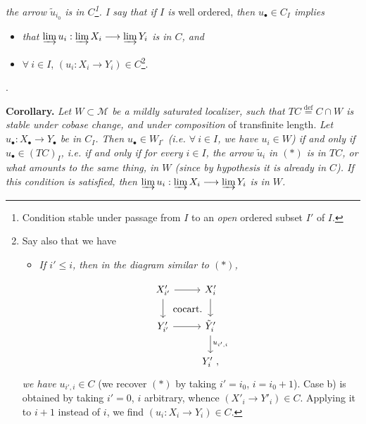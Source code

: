 \documentclass[11pt]{article}
\newcommand{\printedpage}[1]{\marginpar{\footnotesize p.~#1}}
\newcommand{\msp}[1]{\marginpar{\footnotesize [#1]}}
\begin{document}
\textit{the arrow $\tilde{u}_{i_0}$ is in $C$\footnote{Condition stable under passage from $I$ to an \textit{open} ordered subset $I'$ of $I$.}. I say that if $I$ is} well ordered, \textit{then $u_\bullet \in C_I$ implies}
\begin{itemize}[leftmargin=2.5em]
\item[a)] \textit{that $\varinjlim u_i : \varinjlim X_i \longrightarrow \varinjlim Y_i$ is in $C$, and}
\item[b)] $\forall\ i \in I$, $(u_i : X_i \longrightarrow Y_i) \in C$\footnote{Say also that we have
\begin{itemize}[leftmargin=2em]
\item[b$'$)] \textit{If $i' \leq i$, then in the diagram similar to $(*)$,}
\end{itemize}
\[
\begin{tikzcd}[ampersand replacement=\&]
X'_{i'} \arrow[r] \arrow[d] \arrow[dr, phantom, "\text{cocart.}"] \& X'_i \arrow[d] \\
Y'_{i'} \arrow[r] \& \tilde{Y}'_i \arrow[d, "u_{i',i}"] \\
\& Y'_i\ ,
\end{tikzcd}
\]
\textit{we have} $u_{i',i} \in C$ (we recover $(*)$ by taking $i' = i_0$, $i = i_0 + 1$). Case b) is obtained by taking $i' = 0$, $i$ arbitrary, whence $(X'_i \longrightarrow Y'_i) \in C$. Applying it to $i+1$ instead of $i$, we find $(u_i : X_i \longrightarrow Y_i) \in C$.}.
\end{itemize}

. %

\textbf{Corollary.} \textit{Let $W \subset \mathcal{M}$ be a mildly saturated localizer, such that $TC \overset{\text{def}}{=} C \cap W$ is stable under cobase change, and under composition} of transfinite length. \textit{Let $u_\bullet : X_\bullet \longrightarrow Y_\bullet$ be in $C_I$. Then $u_\bullet \in W_{I^{\circ}}$ (i.e. $\forall\ i \in I$, we have $u_i \in W$) if and only if $u_\bullet \in (TC)_I$, i.e. if and only if for every $i \in I$, the arrow $\tilde{u}_i$ in $(*)$ is in $TC$, or what}
\msp{page 2: none}
\printedpage{2}
\msp{page 3}
\textit{amounts to the same thing, in $W$ (since by hypothesis it is already in $C$). If this condition is satisfied, then $\varinjlim u_i : \varinjlim X_i \longrightarrow \varinjlim Y_i$ is in $W$.}

\end{document}
